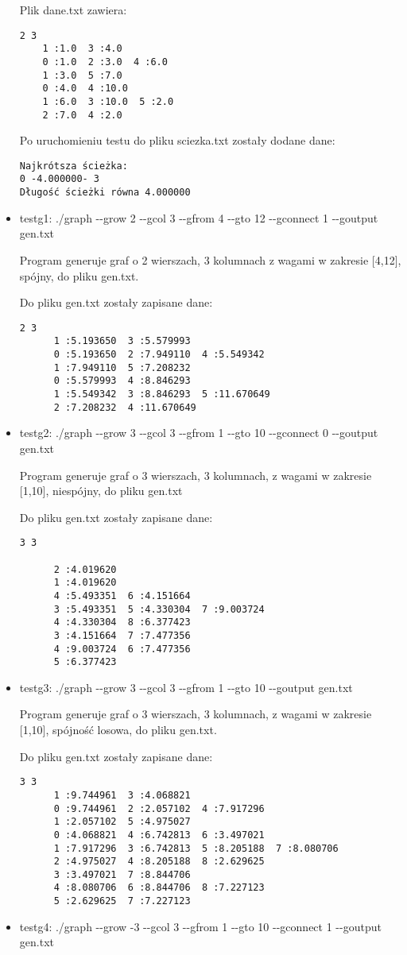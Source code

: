 \documentclass[]{article}
\begin{document}
\begin{itemize}
    Plik dane.txt zawiera:
\begin{verbatim}
2 3
	1 :1.0  3 :4.0
	0 :1.0  2 :3.0  4 :6.0
	1 :3.0  5 :7.0
	0 :4.0  4 :10.0
	1 :6.0  3 :10.0  5 :2.0
	2 :7.0  4 :2.0
\end{verbatim}
Po uruchomieniu testu do pliku sciezka.txt zostały dodane dane:
\begin{verbatim}
Najkrótsza ścieżka: 
0 -4.000000- 3
Długość ścieżki równa 4.000000
\end{verbatim}
\item testg1: ./graph -{}-grow 2 -{}-gcol 3 -{}-gfrom 4 -{}-gto 12 -{}-gconnect 1 -{}-goutput gen.txt

Program generuje graf o 2 wierszach, 3 kolumnach z wagami w zakresie [4,12], spójny, do pliku gen.txt.

Do pliku gen.txt zostały zapisane dane:
\begin{verbatim}
2 3
	  1 :5.193650  3 :5.579993
	  0 :5.193650  2 :7.949110  4 :5.549342
	  1 :7.949110  5 :7.208232
	  0 :5.579993  4 :8.846293
	  1 :5.549342  3 :8.846293  5 :11.670649
	  2 :7.208232  4 :11.670649
\end{verbatim}
\item testg2: ./graph -{}-grow 3 -{}-gcol 3 -{}-gfrom 1 -{}-gto 10 -{}-gconnect 0 -{}-goutput gen.txt

Program generuje graf o 3 wierszach, 3 kolumnach, z wagami w zakresie [1,10], niespójny, do pliku gen.txt

Do pliku gen.txt zostały zapisane dane:
\begin{verbatim}
3 3

	  2 :4.019620
	  1 :4.019620
	  4 :5.493351  6 :4.151664
	  3 :5.493351  5 :4.330304  7 :9.003724
	  4 :4.330304  8 :6.377423
	  3 :4.151664  7 :7.477356
	  4 :9.003724  6 :7.477356
	  5 :6.377423    
\end{verbatim}
\item testg3: ./graph -{}-grow 3 -{}-gcol 3 -{}-gfrom 1 -{}-gto 10 -{}-goutput gen.txt

Program generuje graf o 3 wierszach, 3 kolumnach, z wagami w zakresie [1,10], spójność losowa, do pliku gen.txt.

Do pliku gen.txt zostały zapisane dane:
\begin{verbatim}
3 3
	  1 :9.744961  3 :4.068821
	  0 :9.744961  2 :2.057102  4 :7.917296
	  1 :2.057102  5 :4.975027
	  0 :4.068821  4 :6.742813  6 :3.497021
	  1 :7.917296  3 :6.742813  5 :8.205188  7 :8.080706
	  2 :4.975027  4 :8.205188  8 :2.629625
	  3 :3.497021  7 :8.844706
	  4 :8.080706  6 :8.844706  8 :7.227123
	  5 :2.629625  7 :7.227123
\end{verbatim}
\item testg4: ./graph -{}-grow -3 -{}-gcol 3 -{}-gfrom 1 -{}-gto 10 -{}-gconnect 1 -{}-goutput gen.txt


\end{itemize}
\end{document}
